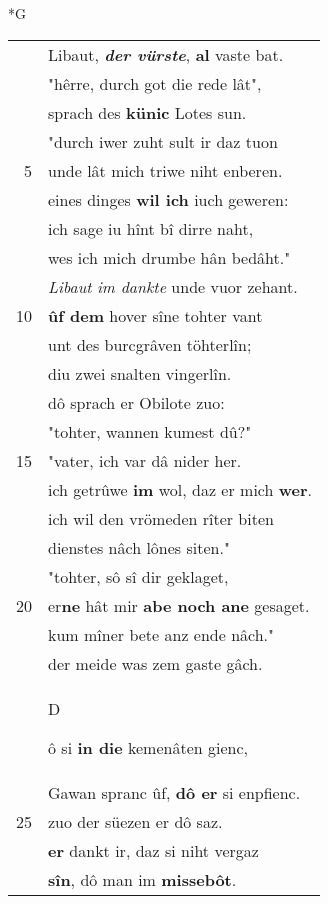 \documentclass[8pt,a4paper,notitlepage]{article}
\begin{document}
\newpage
\begin{table}[ht]
\begin{minipage}[t]{0.5\linewidth}
\small
\begin{center}*G
\end{center}
\begin{tabular}{rl}
 & Libaut, \textit{\textbf{der vürste}}, \textbf{al} vaste bat.\\ 
 & "hêrre, durch got die rede lât",\\ 
 & sprach des \textbf{künic} Lotes sun.\\ 
 & "durch iwer zuht sult ir daz tuon\\ 
5 & unde lât mich triwe niht enberen.\\ 
 & eines dinges \textbf{wil ich} iuch geweren:\\ 
 & ich sage iu hînt bî dirre naht,\\ 
 & wes ich mich drumbe hân bedâht."\\ 
 & \textit{Libaut} \textit{im dankte} unde vuor zehant.\\ 
10 & \textbf{ûf dem} hover sîne tohter vant\\ 
 & unt des burcgrâven töhterlîn;\\ 
 & diu zwei snalten vingerlîn.\\ 
 & dô sprach er Obilote zuo:\\ 
 & "tohter, wannen kumest dû?"\\ 
15 & "vater, ich var dâ nider her.\\ 
 & ich getrûwe \textbf{im} wol, daz er mich \textbf{wer}.\\ 
 & ich wil den vrömeden rîter biten\\ 
 & dienstes nâch lônes siten."\\ 
 & "tohter, sô sî dir geklaget,\\ 
20 & er\textbf{ne} hât mir \textbf{abe noch ane} gesaget.\\ 
 & kum mîner bete anz ende nâch."\\ 
 & der meide was zem gaste gâch.\\ 
 & \begin{large}D\end{large}ô si \textbf{in die} kemenâten gienc,\\ 
 & Gawan spranc ûf, \textbf{dô er} si enpfienc.\\ 
25 & zuo der süezen er dô saz.\\ 
 & \textbf{er} dankt ir, daz si niht vergaz\\ 
 & \textbf{sîn}, dô man im \textbf{missebôt}.\\ 

\end{tabular}
\end{minipage}
\end{table}
\end{document}
